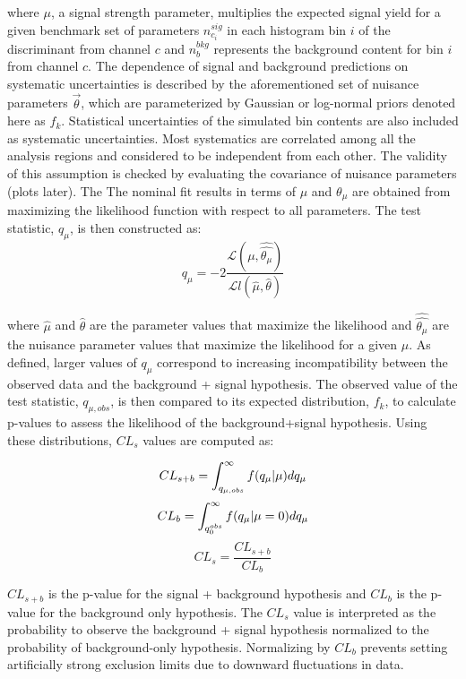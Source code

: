 where $\mu$, a signal strength parameter, multiplies the expected signal yield for a given benchmark set of parameters $n^{sig}_{c_{i}}$ in each histogram bin $i$ of the discriminant from channel $c$ and $n^{bkg}_{b}$ represents the background content for bin $i$ from channel $c$. The dependence of signal and background predictions on systematic uncertainties is described by the aforementioned set of nuisance parameters $\vec{\theta}$, which are parameterized by Gaussian or log-normal priors denoted here as $f_{k}$. Statistical uncertainties of the simulated bin contents are also included as systematic uncertainties. Most systematics are correlated among all the analysis regions and considered to be independent from each other. The validity of this assumption is checked by evaluating the covariance of nuisance parameters (plots later). The The nominal fit results in terms of $\mu$ and $\theta_{\mu}$ are obtained from maximizing the likelihood function with respect to all parameters. The test statistic, $q_{\mu}$, is then constructed as:
\begin{equation}
q_{\mu}=-2\frac{\mathcal{L}(\mu,\hat{\hat{\theta_{\mu}}})}{\mathcal{L}l(\hat{\mu},\hat{\theta})}
\end{equation}
 
 where $\hat{\mu}$ and $\hat{\theta}$ are the parameter values that maximize the likelihood and $\hat{\hat{\theta_{\mu}}}$ are the nuisance parameter values that maximize the likelihood for a given $\mu$. As defined, larger values of $q_{\mu}$ correspond to increasing incompatibility between the observed data and the background + signal hypothesis. The observed value of the test statistic, $q_{\mu, obs}$, is then compared to its expected distribution, $f_{k}$, to calculate p-values to assess the likelihood of the background+signal hypothesis. Using these distributions, $CL_{s}$ values are computed as:
 
 \begin{equation}
 CL_{s+b}=\int_{q_{\mu, obs}}^{\infty}f(q_{\mu}|\mu)dq_{\mu}\\
 \end{equation}
  \begin{equation}
CL_{b}=\int_{q_{0}^{obs}}^{\infty}f(q_{\mu}|\mu=0)dq_{\mu}\\
 \end{equation}
  \begin{equation}
CL_{s}=\frac{CL_{s+b}}{CL_{b}}
 \end{equation}

$CL_{s+b}$ is the p-value for the signal + background hypothesis and $CL_{b}$ is the p-value for the background only hypothesis. The $CL_{s}$ value is interpreted as the probability to observe the background + signal hypothesis normalized to the probability of background-only hypothesis. Normalizing by $CL_{b}$ prevents setting artificially strong exclusion limits due to downward fluctuations in data. 


